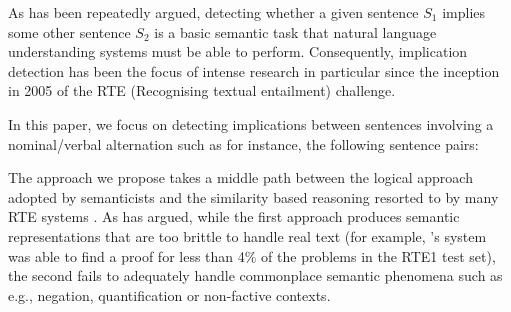 \documentclass[twocolumn,10pt]{article}
\renewcommand\cite{\citep}
\begin{document}


As has been repeatedly argued, detecting whether a given sentence
$S_1$ implies some other sentence $S_2$ is a basic semantic task that
natural language understanding systems must be able to
perform. Consequently, implication detection has been the focus of
intense research in particular since the inception in 2005 of the RTE
(Recognising textual entailment) challenge\cite{Dagan2005}.

In this paper, we focus on detecting implications between sentences
involving a nominal/verbal alternation such as for instance, the
following sentence pairs:


The approach we propose takes a middle path between the logical
approach adopted by semanticists and the similarity based reasoning
resorted to by many RTE systems \cite{Dagan2005}. As \cite{natlog} has
argued, while the first approach produces semantic representations
that are too brittle to handle real text (for example, \cite{Bos2006}'s system was able to find a proof for less than 4\% of the
problems in the RTE1 test set), the second fails to adequately handle
commonplace semantic phenomena such as e.g., negation, quantification
or non-factive contexts.
\end{document}
